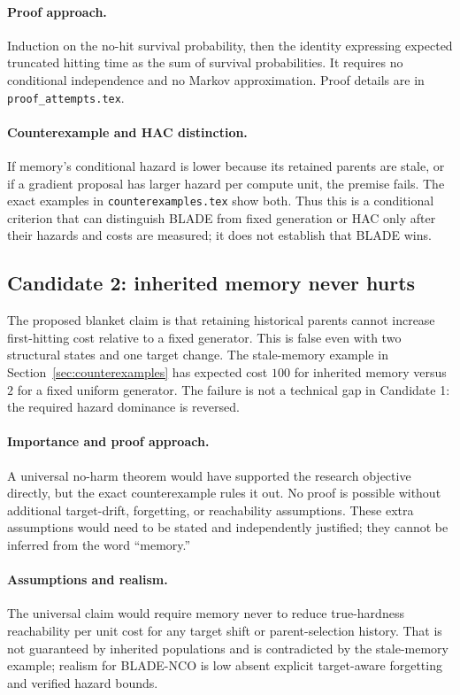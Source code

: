 \paragraph{Proof approach.} Induction on the no-hit survival probability,
then the identity expressing expected truncated hitting time as the sum of
survival probabilities. It requires no conditional independence and no
Markov approximation. Proof details are in \texttt{proof\_attempts.tex}.

\paragraph{Counterexample and HAC distinction.} If memory's conditional
hazard is lower because its retained parents are stale, or if a gradient
proposal has larger hazard per compute unit, the premise fails. The exact
examples in \texttt{counterexamples.tex} show both. Thus this is a conditional
criterion that can distinguish BLADE from fixed generation or HAC only after
their hazards and costs are measured; it does not establish that BLADE wins.

\subsection{Candidate 2: inherited memory never hurts}
   The
proposed blanket claim is that retaining historical
parents cannot increase first-hitting cost relative to a fixed generator.
This is false even with two structural states and one target change. The
stale-memory example in Section~\ref{sec:counterexamples} has expected cost
$100$ for inherited memory versus $2$ for a fixed uniform generator. The
failure is not a technical gap in Candidate 1: the required hazard dominance
is reversed.

\paragraph{Importance and proof approach.} A universal no-harm theorem would
have supported the research objective directly, but the exact counterexample
rules it out. No proof is possible without additional target-drift,
forgetting, or reachability assumptions. These extra assumptions would need
to be stated and independently justified; they cannot be inferred from the
word ``memory.''

\paragraph{Assumptions and realism.} The universal claim would require memory never to reduce true-hardness reachability per unit cost for any target shift or parent-selection history. That is not guaranteed by inherited populations and is contradicted by the stale-memory example; realism for BLADE-NCO is low absent explicit target-aware forgetting and verified hazard bounds.

